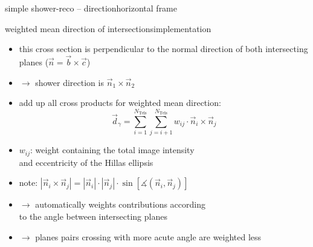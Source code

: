 \documentclass[8pt]{beamer}
\begin{document}
\begin{frame}{simple shower-reco -- direction}{horizontal frame}
    \end{frame}


    \begin{frame}{weighted mean direction of intersections}{implementation}
        \begin{itemize}
            \item this cross section is perpendicular to the normal direction of both
                intersecting planes ($\vec n = \vec b \times \vec c$)
            \item $\rightarrow$ shower direction is $\vec n_1 \times \vec n_2$
            \item add up all cross products for weighted mean direction:
                $$\vec d_\gamma = \sum_{i=1}^{N_\mathrm{Tels}}
                \sum_{j=i+1}^{N_\mathrm{Tels}} w_{ij} \cdot \vec n_i \times \vec n_j$$
            \item $w_{ij}$: weight containing the total image intensity\\
                and eccentricity of the Hillas ellipsis
            \item note: $|\vec n_i \times \vec n_j| = |\vec n_i| \cdot |\vec n_j| \cdot
                \sin[ \measuredangle(\vec n_i, \vec n_j )]$
            \item[] $\rightarrow$ automatically weights contributions according\\
                to the angle between intersecting planes
            \item[] $\rightarrow$ planes pairs crossing with more acute angle are
                weighted less
        \end{itemize}
    \end{frame}
\end{document}
